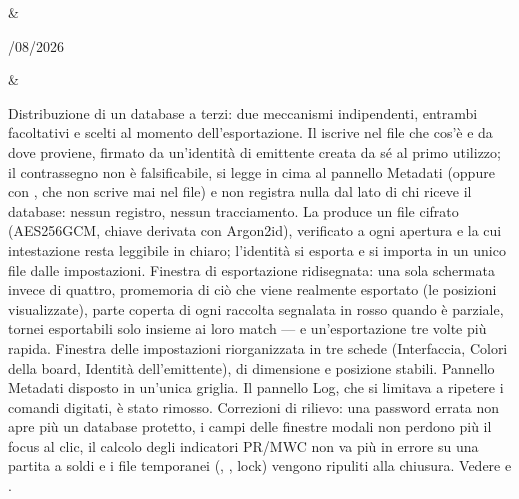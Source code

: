 \documentclass[letterpaper,10pt,italian]{sphinxmanual}
\begin{document}
\begin{savenotes}
\begin{longtable}{}
&\begin{varwidth}[t]{}
/08/2026
\sphinxbeforeendvarwidth
\end{varwidth}%
&\begin{varwidth}[t]{}
\sphinxAtStartPar
Distribuzione di un database a terzi: due meccanismi indipendenti, entrambi facoltativi e scelti al momento dell’esportazione. Il  iscrive nel file che cos’è e da dove proviene, firmato da un’identità di emittente creata da sé al primo utilizzo; il contrassegno non è falsificabile, si legge in cima al pannello Metadati (oppure con , che non scrive mai nel file) e non registra nulla dal lato di chi riceve il database: nessun registro, nessun tracciamento. La  produce un file  cifrato (AES\sphinxhyphen{}256\sphinxhyphen{}GCM, chiave derivata con Argon2id), verificato a ogni apertura e la cui intestazione resta leggibile in chiaro; l’identità si esporta e si importa in un unico file dalle impostazioni. Finestra di esportazione ridisegnata: una sola schermata invece di quattro, promemoria di ciò che viene realmente esportato (le posizioni visualizzate), parte coperta di ogni raccolta segnalata in rosso quando è parziale, tornei esportabili solo insieme ai loro match — e un’esportazione tre volte più rapida. Finestra delle impostazioni riorganizzata in tre schede (Interfaccia, Colori della board, Identità dell’emittente), di dimensione e posizione stabili. Pannello Metadati disposto in un’unica griglia. Il pannello Log, che si limitava a ripetere i comandi digitati, è stato rimosso. Correzioni di rilievo: una password errata non apre più un database protetto, i campi delle finestre modali non perdono più il focus al clic, il calcolo degli indicatori PR/MWC non va più in errore su una partita a soldi e i file temporanei (, , lock) vengono ripuliti alla chiusura. Vedere {\hyperref[\detokenize{manuel:diffusion-controlee}]{}} e {\hyperref[\detokenize{manuel:manuel}]{}}.
\sphinxbeforeendvarwidth
\end{varwidth}%
\\
\sphinxhline\begin{varwidth}[t]{}

\end{varwidth}
\end{longtable}
\end{savenotes}
\end{document}
